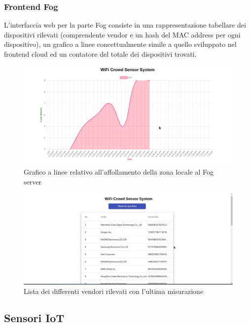 \subsubsection{Frontend Fog}

L'interfaccia web per la parte Fog consiste in una rappresentazione tabellare dei dispositivi rilevati (comprendente vendor e un hash del MAC address per ogni dispositivo), un grafico a linee concettualmente simile a quello sviluppato nel frontend cloud ed un contatore del totale dei dispositivi trovati.

\begin{figure}[H]
  \centering
  \includegraphics[width=\textwidth]{res/fig/fog-chart.jpg}
  \caption{Grafico a linee relativo all'affollamento della zona locale al Fog server}%
  \label{fig:fog-chart}
\end{figure}

\begin{figure}[H]
  \centering
  \includegraphics[width=\textwidth]{res/fig/fog-table.jpg}
  \caption{Lista dei differenti vendori rilevati con l'ultima misurazione}%
  \label{fig:fog-table}
\end{figure}

\subsection{Sensori IoT}


